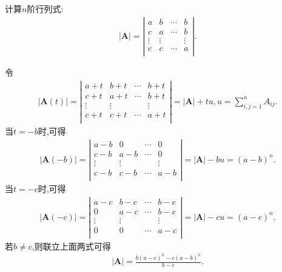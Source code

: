\documentclass[lang=cn,newtx,10pt,scheme=chinese]{elegantbook}
\begin{document}
\begin{exercise}
计算$n$阶行列式:
\begin{align*}
|\boldsymbol{A}|=\left| \begin{matrix}
a&		b&		\cdots&		b\\
c&		a&		\cdots&		b\\
\vdots&		\vdots&		&		\vdots\\
c&		c&		\cdots&		a\\
\end{matrix} \right|.
\nonumber
\end{align*}
\end{exercise}
\begin{solution}
{\color{blue}}
令
\begin{align*}
|\boldsymbol{A}(t)|=\left| \begin{matrix}
a+t&		b+t&		\cdots&		b+t\\
c+t&		a+t&		\cdots&		b+t\\
\vdots&		\vdots&		&		\vdots\\
c+t&		c+t&		\cdots&		a+t\\
\end{matrix} \right|=|\boldsymbol{A}|+tu,  u=\sum_{i,j=1}^n{A_{ij}.}
\nonumber
\end{align*}
当$t=-b$时,可得
\begin{align*}
|\boldsymbol{A}(-b)|=\left| \begin{matrix}
a-b&		0&		\cdots&		0\\
c-b&		a-b&		\cdots&		0\\
\vdots&		\vdots&		&		\vdots\\
c-b&		c-b&		\cdots&		a-b\\
\end{matrix} \right|=|\boldsymbol{A}|-bu=(a-b)^n.
\end{align*}
当$t=-c$时,可得
\begin{align*}
|\boldsymbol{A}(-c)|=\left| \begin{matrix}
a-c&		b-c&		\cdots&		b-c\\
0&		a-c&		\cdots&		b-c\\
\vdots&		\vdots&		&		\vdots\\
0&		0&		\cdots&		a-c\\
\end{matrix} \right|=|\boldsymbol{A}|-cu=(a-c)^n.
\end{align*}
若$b\ne c$,则联立上面两式可得
\begin{align*}
\left| \boldsymbol{A} \right|=\frac{b\left( a-c \right) ^n-c\left( a-b \right) ^n}{b-c}.

\end{align*}
\end{solution}
\end{document}

